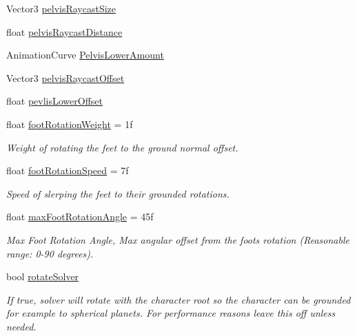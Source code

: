 \begin{DoxyCompactItemize}
\item 
Vector3 \mbox{\hyperlink{class_root_motion_1_1_final_i_k_1_1_grounding_ab0850b9c111dff83ad11228e8bfd7abc}{pelvis\+Raycast\+Size}}
\item 
float \mbox{\hyperlink{class_root_motion_1_1_final_i_k_1_1_grounding_a8690352a2baceb944d30498d7ca5053a}{pelvis\+Raycast\+Distance}}
\item 
Animation\+Curve \mbox{\hyperlink{class_root_motion_1_1_final_i_k_1_1_grounding_a2cfbf2c57416bd6e0483f53be0efbb60}{Pelvis\+Lower\+Amount}}
\item 
Vector3 \mbox{\hyperlink{class_root_motion_1_1_final_i_k_1_1_grounding_a671248ebc7a73c7cb03c7370ca43b48b}{pelvis\+Raycast\+Offset}}
\item 
float \mbox{\hyperlink{class_root_motion_1_1_final_i_k_1_1_grounding_a7632b0b532a8d6c0d90117a30d11a34e}{pevlis\+Lower\+Offset}}
\item 
float \mbox{\hyperlink{class_root_motion_1_1_final_i_k_1_1_grounding_a5acf1589fdfb04b760e460e831361553}{foot\+Rotation\+Weight}} = 1f
\begin{DoxyCompactList}\small\item\em Weight of rotating the feet to the ground normal offset. \end{DoxyCompactList}\item 
float \mbox{\hyperlink{class_root_motion_1_1_final_i_k_1_1_grounding_ad587fd3c3eff6eba63705726acfd3ded}{foot\+Rotation\+Speed}} = 7f
\begin{DoxyCompactList}\small\item\em Speed of slerping the feet to their grounded rotations. \end{DoxyCompactList}\item 
float \mbox{\hyperlink{class_root_motion_1_1_final_i_k_1_1_grounding_aeba0887741bad61eea60781791e5196d}{max\+Foot\+Rotation\+Angle}} = 45f
\begin{DoxyCompactList}\small\item\em Max Foot Rotation Angle, Max angular offset from the foot\textquotesingle{}s rotation (Reasonable range\+: 0-\/90 degrees). \end{DoxyCompactList}\item 
bool \mbox{\hyperlink{class_root_motion_1_1_final_i_k_1_1_grounding_a54acf8006a5d13da07def413ce38c3dc}{rotate\+Solver}}
\begin{DoxyCompactList}\small\item\em If true, solver will rotate with the character root so the character can be grounded for example to spherical planets. For performance reasons leave this off unless needed. \end{DoxyCompactList}\item 

\end{DoxyCompactItemize}
